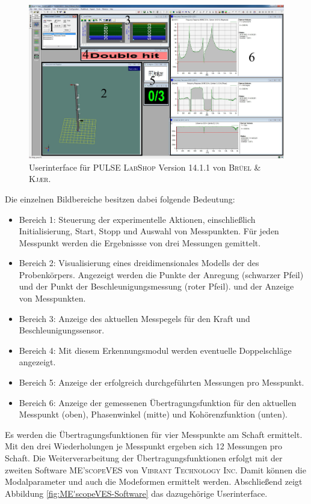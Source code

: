 	\begin{figure}[H]
		\centering
		\includegraphics[width=0.96\linewidth, height=0.42\textheight]{Experimentelle_Untersuchungen/Schaft_10x8_0N_parallel_Messung.png}
		\caption{Userinterface für \textsc{PULSE LabShop} Version 14.1.1 von \textsc{Brüel \& Kj\ae{}r}.}
		\label{fig:B&K-Software}
	\end{figure}
	Die einzelnen Bildbereiche besitzen dabei folgende Bedeutung:
	\begin{itemize}
		\item Bereich 1: Steuerung der experimentelle Aktionen, einschließlich Initialisierung, Start, Stopp und Auswahl von Messpunkten. Für jeden Messpunkt werden die Ergebnissse von drei Messungen gemittelt.
		\item Bereich 2: Visualisierung eines dreidimensionales Modells der des Probenkörpers. Angezeigt werden die Punkte der Anregung (schwarzer Pfeil) und der Punkt der Beschleunigungsmessung (roter Pfeil).  und der Anzeige von Messpunkten.
		\item Bereich 3: Anzeige des aktuellen Messpegels für den Kraft und Beschleunigungssensor.
		\item Bereich 4: Mit diesem Erkennungsmodul werden eventuelle Doppelschläge angezeigt.
		\item Bereich 5: Anzeige der erfolgreich durchgeführten Messungen pro Messpunkt. 
		\item Bereich 6: Anzeige der gemessenen Übertragungsfunktion für den aktuellen Messpunkt (oben), Phasenwinkel (mitte) und Kohörenzfunktion (unten).
	\end{itemize}
	
	Es werden die Übertragungsfunktionen für vier Messpunkte am Schaft ermittelt. Mit den drei Wiederholungen je Messpunkt ergeben sich 12 Messungen pro Schaft. Die Weiterverarbeitung der Übertragungsfunktionen erfolgt mit der zweiten Software \textsc{ME'scopeVES} von \textsc{Vibrant Technology Inc.} Damit können die Modalparameter und auch die Modeformen ermittelt werden. Abschließend zeigt Abbildung \ref{fig:ME'scopeVES-Software} das dazugehörige Userinterface.
	
